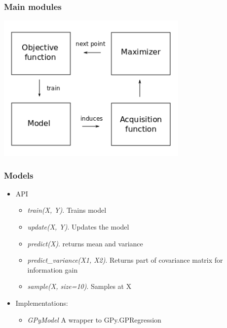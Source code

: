 \documentclass[10pt,handout]{beamer}
\begin{document}
\begin{frame}
\frametitle{Main modules}

\begin{center}
\includegraphics[width=0.7\textwidth]{robo_framework.png}
\end{center}


\end{frame}

\begin{frame}
\frametitle{Models}
\begin{itemize}
\item API
\begin{itemize}
\item \textit{train(X, Y)}. Trains model
\item \textit{update(X, Y)}. Updates the model
\item \textit{predict(X)}. returns mean and variance
\item \textit{predict\_variance(X1, X2)}. Returns part of covariance matrix for information gain
\item \textit{sample(X, size=10)}. Samples at X
\end{itemize}
\item Implementations:
\begin{itemize}
\item \textit{GPyModel} A wrapper to GPy.GPRegression
\end{itemize} 
\end{itemize}
\end{frame}
\end{document}
